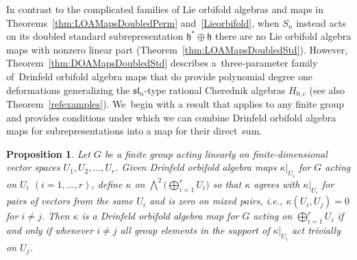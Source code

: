 \documentclass[pdftex]{sigma}
\numberwithin{equation}{section}
\newtheorem{Proposition}[Theorem]{Proposition}
 { \theoremstyle{definition}
\newtheorem{Definition}[Theorem]{Definition}
\newtheorem{Remark}[Theorem]{Remark}
\newtheorem{case}{Case}}
\begin{document}
In contrast to the complicated families of Lie orbifold algebras and
maps in Theorems~\ref{thm:LOAMapsDoubledPerm} and~\ref{Lieorbifold},
when $S_n$ instead acts on its doubled standard subrepresentation
$\mathfrak{h}^*\oplus\mathfrak{h}$ there are no Lie orbifold algebra maps with nonzero linear
part (Theorem~\ref{thm:LOAMapsDoubledStd}).
However, Theorem~\ref{thm:DOAMapsDoubledStd} describes a~three-parameter
family of~Drinfeld orbifold algebra maps that do provide polynomial degree
one deformations generalizing the $\mathfrak{sl}_n$-type rational Cherednik
algebras $H_{0,c}$ (see also Theorem~\ref{refexamples}). We~begin with a result that applies to any finite group and
provides conditions under which we can combine Drinfeld orbifold algebra maps for subrepresentations into a map for their direct~sum.

\begin{Proposition}	\label{prop:directsum}
Let $G$ be a finite group acting linearly on finite-dimensional vector spaces $U_1, U_2,\ldots,U_r$.
Given Drinfeld orbifold algebra maps $\kappa|_{U_i}$ for $G$ acting on $U_i$ $(i=1,\ldots,r)$, define $\kappa$ on $\bigwedge^2 \big(\bigoplus_{i=1}^r U_i\big)$ so that $\kappa$ agrees with $\kappa|_{U_i}$ for pairs of vectors from the same $U_i$ and is zero on mixed pairs, i.e., $\kappa(U_i,U_j)=0$ for $i\neq j$. Then $\kappa$ is a Drinfeld orbifold algebra map for $G$ acting on $\bigoplus_{i=1}^r U_i$ if and only if whenever $i\neq j$ all group elements in the support of $\kappa|_{U_i}$ act trivially on $U_j$.
\end{Proposition}
\end{document}

